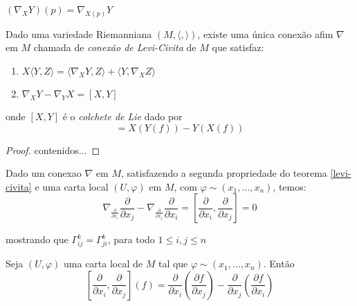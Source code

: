 \begin{obse}
	$(\nabla_X Y)(p) = \nabla_{X(p)} Y$
\end{obse}

\begin{teo}\label{levi-civita}
	Dado uma variedade Riemanniana $(M,\langle , \rangle)$, existe uma única conexão afim $\nabla$ em $M$ chamada de \emph{conexão de Levi-Civita} de $M$ que satisfaz:
	\begin{enumerate}
		\item $X \langle Y,Z \rangle = \langle \nabla_X Y,Z \rangle + \langle Y, \nabla_X Z\rangle$
		\item $\nabla_X Y - \nabla_Y X = [X,Y]$
	\end{enumerate}

onde $[X,Y]$ é o \emph{colchete de Lie} dado por
\begin{equation*}
	[X,Y] = X(Y(f)) - Y(X(f))
\end{equation*}
\end{teo}

\begin{proof}
	contenidos...
\end{proof}

\begin{obse}
	Dado um conexao $\nabla$ em $M$, satisfazendo a segunda propriedade do teorema \ref{levi-civita} e uma carta local $(U,\varphi)$ em $M$, com $\varphi \sim (x_1, \ldots, x_n)$, temos:
	\begin{equation*}
		\nabla_{\frac{\partial}{\partial x_i}} \frac{\partial}{\partial x_j} - \nabla_{\frac{\partial}{\partial x_j}} \frac{\partial}{\partial x_i} = \left[ \frac{\partial}{\partial x_i}, \frac{\partial}{\partial x_j} \right] =0
	\end{equation*}
	
	mostrando que $\Gamma_{ij}^k = \Gamma_{ji}^k$, para todo $1 \leq i,j \leq n$
\end{obse}

\begin{obse}
	Seja $(U,\varphi)$ uma carta local de $M$ tal que $\varphi \sim (x_1, \ldots,x_n)$. Então
	\begin{equation*}
		\left[\frac{\partial}{\partial x_i},\frac{\partial}{\partial x_j}\right](f) = \frac{\partial}{\partial x_i} \left(\frac{\partial f}{\partial x_j}\right) - \frac{\partial}{\partial x_j} \left(\frac{\partial f}{\partial x_i}\right)
	\end{equation*}
\end{obse}

